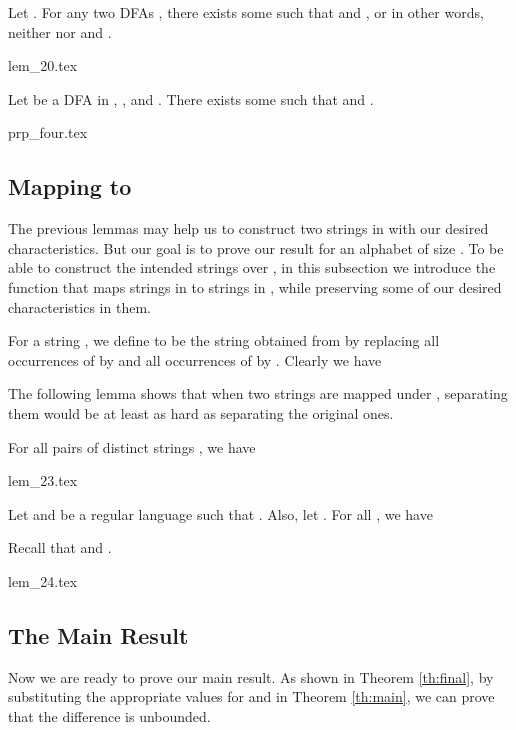 \documentclass[preprint, 12pt]{elsarticle}
\begin{document}
	\begin{lemma}
		\label{lem:20}
		Let . For any two DFAs , there exists some  such that  and , or in other words, neither  nor  \distinguishes  and .
	\end{lemma}
	{lem_20.tex}
	
	\begin{proposition}
		\label{prp:four}
		Let  be a DFA in , , and . There exists some  such that  and . 
	\end{proposition}
	{prp_four.tex}
				

	
	\subsection{Mapping  to }
	\label{subsec:four}
	The previous lemmas may help us to construct two strings in  with our desired characteristics. But our goal is to prove our result for an alphabet of size . To be able to construct the intended strings over , in this subsection we introduce the function  that maps strings in  to strings in , while preserving some of our desired characteristics in them.
	
	\begin{definition}
		For a string , we define  to be the string obtained from  by replacing all occurrences of  by  and all occurrences of  by . Clearly we have 		
	\end{definition}
	
	The following lemma shows that when two strings are mapped under , separating them would be at least as hard as separating the original ones.
	\begin{lemma}
		\label{lem:23}
		For all pairs of distinct strings , we have 
		
	\end{lemma}
	{lem_23.tex}
	
	\begin{lemma}
		\label{lem:24}
		Let  and  be a regular language such that .
		Also, let .
		For all , we have
		
		Recall that  and  .
	\end{lemma}
	{lem_24.tex}
	
	\subsection{The Main Result}
	\label{subsec:five}
	Now we are ready to prove our main result. As shown in Theorem \ref{th:final}, by substituting the appropriate values for  and  in Theorem \ref{th:main}, we can prove that the difference  is unbounded.
	
\end{document}
